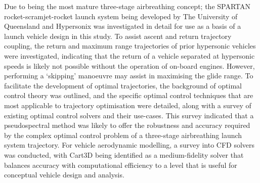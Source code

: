        Due to being the most mature three-stage airbreathing concept; the SPARTAN rocket-scramjet-rocket launch system being developed by The University of Queensland and Hypersonix was investigated in detail for use as a basis of a launch vehicle design in this study. 
       To assist ascent and return trajectory coupling, the return and maximum range trajectories of prior hypersonic vehicles were investigated, indicating that the return of a vehicle separated at hypersonic speeds is likely not possible without the operation of on-board engines. However, performing a `skipping' manoeuvre may assist in maximising the glide range. 
       To facilitate the development of optimal trajectories, the background of optimal control theory was outlined, and the specific optimal control techniques that are most applicable to trajectory optimisation were detailed, along with a survey of existing optimal control solvers and their use-cases. This survey indicated that a pseudospectral method was likely to offer the robustness and accuracy required by the complex optimal control problem of a three-stage airbreathing launch system trajectory. 
	For vehicle aerodynamic modelling, a survey into CFD solvers was conducted, with Cart3D being identified as a medium-fidelity solver that balances accuracy with computational efficiency to a level that is useful for conceptual vehicle design and analysis. 

